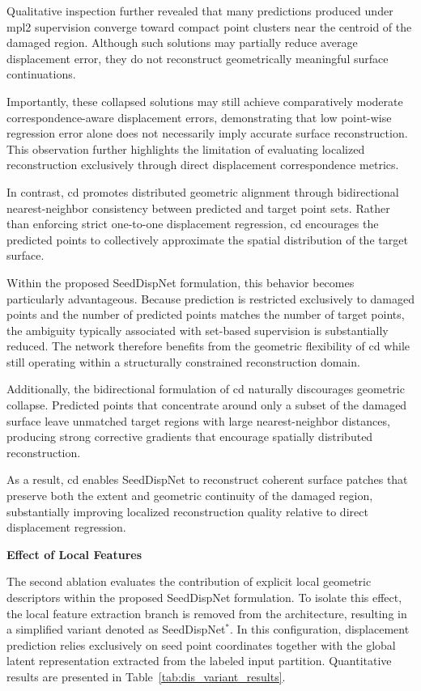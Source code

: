 Qualitative inspection further revealed that many predictions produced under \ac{mpl2} supervision converge toward compact point clusters near the centroid of the damaged region. Although such solutions may partially reduce average displacement error, they do not reconstruct geometrically meaningful surface continuations.

Importantly, these collapsed solutions may still achieve comparatively moderate correspondence-aware displacement errors, demonstrating that low point-wise regression error alone does not necessarily imply accurate surface reconstruction. This observation further highlights the limitation of evaluating localized reconstruction exclusively through direct displacement correspondence metrics.

In contrast, \ac{cd} promotes distributed geometric alignment through bidirectional nearest-neighbor consistency between predicted and target point sets. Rather than enforcing strict one-to-one displacement regression, \ac{cd} encourages the predicted points to collectively approximate the spatial distribution of the target surface.

Within the proposed SeedDispNet formulation, this behavior becomes particularly advantageous. Because prediction is restricted exclusively to damaged points and the number of predicted points matches the number of target points, the ambiguity typically associated with set-based supervision is substantially reduced. The network therefore benefits from the geometric flexibility of \ac{cd} while still operating within a structurally constrained reconstruction domain.

Additionally, the bidirectional formulation of \ac{cd} naturally discourages geometric collapse. Predicted points that concentrate around only a subset of the damaged surface leave unmatched target regions with large nearest-neighbor distances, producing strong corrective gradients that encourage spatially distributed reconstruction.

As a result, \ac{cd} enables SeedDispNet to reconstruct coherent surface patches that preserve both the extent and geometric continuity of the damaged region, substantially improving localized reconstruction quality relative to direct displacement regression.

\vspace{5mm}
\noindent\textbf{Effect of Local Features}
\vspace{2mm}

The second ablation evaluates the contribution of explicit local geometric descriptors within the proposed SeedDispNet formulation. To isolate this effect, the local feature extraction branch is removed from the architecture, resulting in a simplified variant denoted as SeedDispNet$^\ast$. In this configuration, displacement prediction relies exclusively on seed point coordinates together with the global latent representation extracted from the labeled input partition. Quantitative results are presented in Table~\ref{tab:dis_variant_results}.

